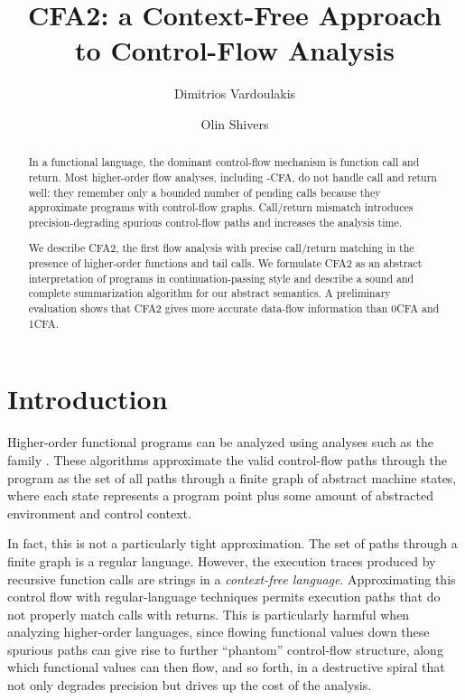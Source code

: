 \documentclass{LMCS}
\theoremstyle{definition} \newtheorem{property}[thm]{Property}
\begin{document}
\title{CFA2: a Context-Free Approach \\ to Control-Flow Analysis}

\author[D.~Vardoulakis]{Dimitrios Vardoulakis}
\address{Northeastern University} 

\author[O.~Shivers]{Olin Shivers}
\address{ pt} 



\newcommand{\myp}[1]{\tb{#1}}

\begin{abstract}
In a functional language, the dominant control-flow mechanism is function call
and return.
Most higher-order flow analyses, including -CFA, do not handle call and 
return well: they remember only a bounded number of pending calls because they
approximate programs with control-flow graphs.
Call/return mismatch introduces precision-degrading spurious control-flow
paths and increases the analysis time.

We describe CFA2, the first flow analysis with precise call/return matching
in the presence of higher-order functions and tail calls.
We formulate CFA2 as an abstract interpretation of programs in 
continuation-passing style and describe a sound and complete summarization
algorithm for our abstract semantics.
A preliminary evaluation shows that CFA2 gives more accurate data-flow
information than 0CFA and 1CFA.
\end{abstract}

\maketitle

\section*{Introduction}

\noindent Higher-order functional programs can be analyzed using analyses such as the
\kcfa{} family \cite{diss/cmu/91/olin}.
These algorithms approximate the valid control-flow paths through the
program as the set of all paths through a finite graph of abstract
machine states, where each state represents a program point plus some
amount of abstracted environment and control context.

In fact, this is not a particularly tight approximation.
The set of paths through a finite graph is a regular language.
However, the execution traces produced by recursive 
function calls are strings in a \emph{context-free language}.
Approximating this control flow with regular-language techniques
permits execution paths that do not properly match calls with returns.
This is particularly harmful when analyzing higher-order languages, 
since flowing functional values down these spurious paths can 
give rise to further ``phantom'' control-flow structure, 
along which functional values can then flow, and so forth, 
in a destructive spiral that not only degrades precision but
drives up the cost of the analysis.
\end{document}
